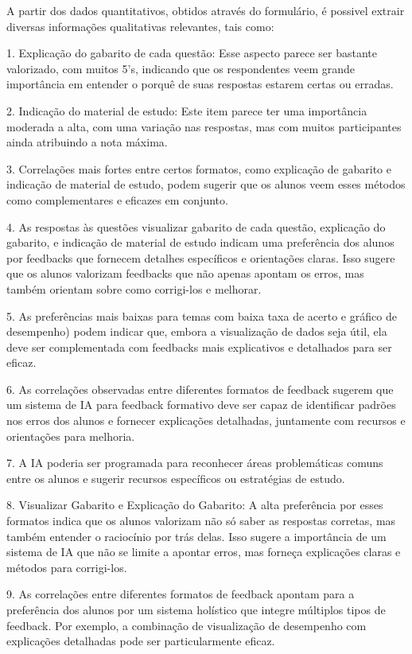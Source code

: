 A partir dos dados quantitativos, obtidos através do formulário, é possivel extrair diversas informações qualitativas relevantes, tais como: 

1. Explicação do gabarito de cada questão: Esse aspecto parece ser bastante valorizado, com muitos 5's, indicando que os respondentes veem grande importância em entender o porquê de suas respostas estarem certas ou erradas.

2. Indicação do material de estudo: Este item parece ter uma importância moderada a alta, com uma variação nas respostas, mas com muitos participantes ainda atribuindo a nota máxima.

3. Correlações mais fortes entre certos formatos, como explicação de gabarito e indicação de material de estudo, podem sugerir que os alunos veem esses métodos como complementares e eficazes em conjunto.

4. As respostas às questões visualizar gabarito de cada questão, explicação do gabarito, e indicação de material de estudo indicam uma preferência dos alunos por feedbacks que fornecem detalhes específicos e orientações claras. Isso sugere que os alunos valorizam feedbacks que não apenas apontam os erros, mas também orientam sobre como corrigi-los e melhorar.

5. As preferências mais baixas para temas com baixa taxa de acerto e gráfico de desempenho) podem indicar que, embora a visualização de dados seja útil, ela deve ser complementada com feedbacks mais explicativos e detalhados para ser eficaz.

6. As correlações observadas entre diferentes formatos de feedback sugerem que um sistema de IA para feedback formativo deve ser capaz de identificar padrões nos erros dos alunos e fornecer explicações detalhadas, juntamente com recursos e orientações para melhoria.

7. A IA poderia ser programada para reconhecer áreas problemáticas comuns entre os alunos e sugerir recursos específicos ou estratégias de estudo.

8. Visualizar Gabarito e Explicação do Gabarito: A alta preferência por esses formatos indica que os alunos valorizam não só saber as respostas corretas, mas também entender o raciocínio por trás delas. Isso sugere a importância de um sistema de IA que não se limite a apontar erros, mas forneça explicações claras e métodos para corrigi-los.

9. As correlações entre diferentes formatos de feedback apontam para a preferência dos alunos por um sistema holístico que integre múltiplos tipos de feedback. Por exemplo, a combinação de visualização de desempenho com explicações detalhadas pode ser particularmente eficaz.


